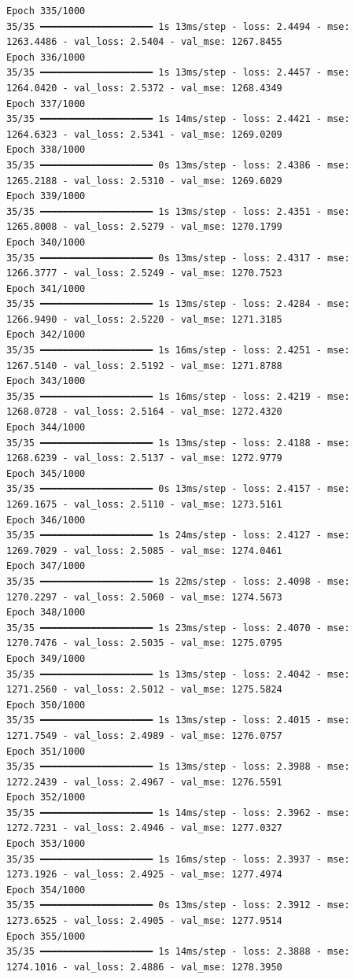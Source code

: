 \documentclass[
  letterpaper,
  DIV=11,
  numbers=noendperiod]{scrreprt}
\begin{document}
\begin{verbatim}
Epoch 335/1000
35/35 ━━━━━━━━━━━━━━━━━━━━ 1s 13ms/step - loss: 2.4494 - mse: 1263.4486 - val_loss: 2.5404 - val_mse: 1267.8455
Epoch 336/1000
35/35 ━━━━━━━━━━━━━━━━━━━━ 1s 13ms/step - loss: 2.4457 - mse: 1264.0420 - val_loss: 2.5372 - val_mse: 1268.4349
Epoch 337/1000
35/35 ━━━━━━━━━━━━━━━━━━━━ 1s 14ms/step - loss: 2.4421 - mse: 1264.6323 - val_loss: 2.5341 - val_mse: 1269.0209
Epoch 338/1000
35/35 ━━━━━━━━━━━━━━━━━━━━ 0s 13ms/step - loss: 2.4386 - mse: 1265.2188 - val_loss: 2.5310 - val_mse: 1269.6029
Epoch 339/1000
35/35 ━━━━━━━━━━━━━━━━━━━━ 1s 13ms/step - loss: 2.4351 - mse: 1265.8008 - val_loss: 2.5279 - val_mse: 1270.1799
Epoch 340/1000
35/35 ━━━━━━━━━━━━━━━━━━━━ 0s 13ms/step - loss: 2.4317 - mse: 1266.3777 - val_loss: 2.5249 - val_mse: 1270.7523
Epoch 341/1000
35/35 ━━━━━━━━━━━━━━━━━━━━ 1s 13ms/step - loss: 2.4284 - mse: 1266.9490 - val_loss: 2.5220 - val_mse: 1271.3185
Epoch 342/1000
35/35 ━━━━━━━━━━━━━━━━━━━━ 1s 16ms/step - loss: 2.4251 - mse: 1267.5140 - val_loss: 2.5192 - val_mse: 1271.8788
Epoch 343/1000
35/35 ━━━━━━━━━━━━━━━━━━━━ 1s 16ms/step - loss: 2.4219 - mse: 1268.0728 - val_loss: 2.5164 - val_mse: 1272.4320
Epoch 344/1000
35/35 ━━━━━━━━━━━━━━━━━━━━ 1s 13ms/step - loss: 2.4188 - mse: 1268.6239 - val_loss: 2.5137 - val_mse: 1272.9779
Epoch 345/1000
35/35 ━━━━━━━━━━━━━━━━━━━━ 0s 13ms/step - loss: 2.4157 - mse: 1269.1675 - val_loss: 2.5110 - val_mse: 1273.5161
Epoch 346/1000
35/35 ━━━━━━━━━━━━━━━━━━━━ 1s 24ms/step - loss: 2.4127 - mse: 1269.7029 - val_loss: 2.5085 - val_mse: 1274.0461
Epoch 347/1000
35/35 ━━━━━━━━━━━━━━━━━━━━ 1s 22ms/step - loss: 2.4098 - mse: 1270.2297 - val_loss: 2.5060 - val_mse: 1274.5673
Epoch 348/1000
35/35 ━━━━━━━━━━━━━━━━━━━━ 1s 23ms/step - loss: 2.4070 - mse: 1270.7476 - val_loss: 2.5035 - val_mse: 1275.0795
Epoch 349/1000
35/35 ━━━━━━━━━━━━━━━━━━━━ 1s 13ms/step - loss: 2.4042 - mse: 1271.2560 - val_loss: 2.5012 - val_mse: 1275.5824
Epoch 350/1000
35/35 ━━━━━━━━━━━━━━━━━━━━ 1s 13ms/step - loss: 2.4015 - mse: 1271.7549 - val_loss: 2.4989 - val_mse: 1276.0757
Epoch 351/1000
35/35 ━━━━━━━━━━━━━━━━━━━━ 1s 13ms/step - loss: 2.3988 - mse: 1272.2439 - val_loss: 2.4967 - val_mse: 1276.5591
Epoch 352/1000
35/35 ━━━━━━━━━━━━━━━━━━━━ 1s 14ms/step - loss: 2.3962 - mse: 1272.7231 - val_loss: 2.4946 - val_mse: 1277.0327
Epoch 353/1000
35/35 ━━━━━━━━━━━━━━━━━━━━ 1s 16ms/step - loss: 2.3937 - mse: 1273.1926 - val_loss: 2.4925 - val_mse: 1277.4974
Epoch 354/1000
35/35 ━━━━━━━━━━━━━━━━━━━━ 0s 13ms/step - loss: 2.3912 - mse: 1273.6525 - val_loss: 2.4905 - val_mse: 1277.9514
Epoch 355/1000
35/35 ━━━━━━━━━━━━━━━━━━━━ 1s 14ms/step - loss: 2.3888 - mse: 1274.1016 - val_loss: 2.4886 - val_mse: 1278.3950

\end{verbatim}
\end{document}
